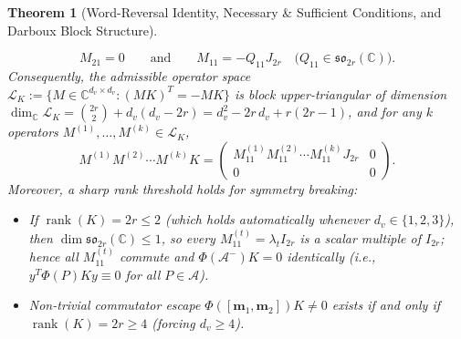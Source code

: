 \documentclass[11pt,a4paper]{article}
\newtheorem{theorem}{Theorem}[section]
\theoremstyle{definition}
\DeclareMathOperator{\rank}{rank}
\begin{document}
\begin{theorem}[Word-Reversal Identity, Necessary \& Sufficient Conditions, and Darboux Block Structure]
\begin{enumerate}
  \[
    M_{21} = 0 \qquad \text{and} \qquad M_{11} = -Q_{11} J_{2r} \quad \big(Q_{11} \in \mathfrak{so}_{2r}(\mathbb{C})\big).
  \]
  Consequently, the admissible operator space $\mathcal{L}_K := \{M \in \mathbb{C}^{d_v \times d_v} : (MK)^T = -MK\}$ is block upper-triangular of dimension $\dim_{\mathbb{C}} \mathcal{L}_K = \binom{2r}{2} + d_v(d_v - 2r) = d_v^2 - 2r\,d_v + r(2r-1)$, and for any $k$ operators $M^{(1)},\dots,M^{(k)} \in \mathcal{L}_K$,
  \[
    M^{(1)} M^{(2)} \cdots M^{(k)} K = \begin{pmatrix} M_{11}^{(1)} M_{11}^{(2)} \cdots M_{11}^{(k)} J_{2r} & 0 \\ 0 & 0 \end{pmatrix}.
  \]
  Moreover, a sharp rank threshold holds for symmetry breaking:
  \begin{itemize}
    \item If $\rank(K) = 2r \le 2$ (which holds automatically whenever $d_v \in \{1, 2, 3\}$), then $\dim\mathfrak{so}_{2r}(\mathbb{C}) \le 1$, so every $M_{11}^{(t)} = \lambda_t I_{2r}$ is a scalar multiple of $I_{2r}$; hence all $M_{11}^{(t)}$ commute and $\Phi(\mathcal{A}^-) K = 0$ identically (i.e., $y^T \Phi(P) K y \equiv 0$ for \emph{all} $P \in \mathcal{A}$).
    \item Non-trivial commutator escape $\Phi([\mathbf{m}_1, \mathbf{m}_2]) K \neq 0$ exists if and only if $\rank(K) = 2r \ge 4$ (forcing $d_v \ge 4$).
  \end{itemize}
\end{enumerate}
\end{theorem}
\end{document}
